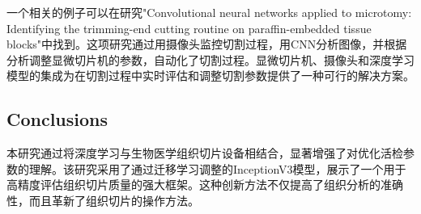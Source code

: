 一个相关的例子可以在研究"Convolutional neural networks applied to microtomy: Identifying the trimming-end cutting routine on paraffin-embedded tissue blocks"\cite{6.4}中找到。这项研究通过用摄像头监控切割过程，用CNN分析图像，并根据分析调整显微切片机的参数，自动化了切割过程。显微切片机、摄像头和深度学习模型的集成为在切割过程中实时评估和调整切割参数提供了一种可行的解决方案。

\subsection{Conclusions}







本研究通过将深度学习与生物医学组织切片设备相结合，显著增强了对优化活检参数的理解。该研究采用了通过迁移学习调整的InceptionV3模型，展示了一个用于高精度评估组织切片质量的强大框架。这种创新方法不仅提高了组织分析的准确性，而且革新了组织切片的操作方法。

